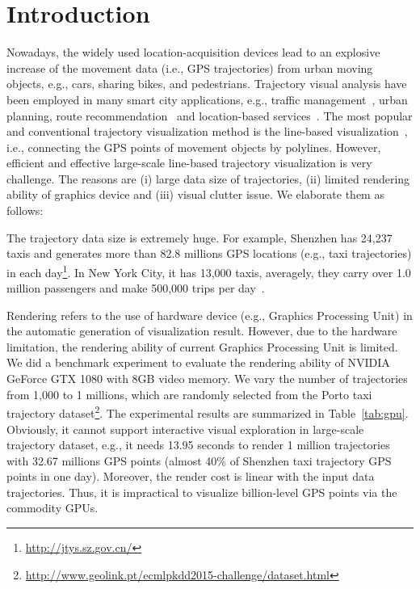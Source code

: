 \section{Introduction}
Nowadays, the widely used location-acquisition devices lead to an explosive increase of the movement data (i.e., GPS trajectories) from urban moving objects, e.g., cars, sharing bikes, and pedestrians.
Trajectory visual analysis have been employed in many smart city applications, e.g.,  traffic management~\cite{wang2014visual}, urban planning, route recommendation~\cite{zheng2011learning} and location-based services~\cite{liu2016smartadp, zheng2010collaborative}.
The most popular and conventional trajectory visualization method is the line-based visualization~\cite{chen2015survey}, i.e., connecting the GPS points of movement objects by polylines.
However, efficient and effective large-scale line-based trajectory visualization is very challenge.
The reasons are (i) large data size of trajectories, (ii) limited rendering ability of graphics device and (iii) visual clutter issue.
We elaborate them as follows:

 The trajectory data size is extremely huge.
For example, Shenzhen has 24,237 taxis and generates more than 82.8 millions GPS locations (e.g., taxi trajectories) in each day\footnote{\url{http://jtys.sz.gov.cn/}}.
In New York City, it has 13,000 taxis, averagely, they carry over 1.0 million passengers and make 500,000 trips per day~\cite{ferreira2013visual}.

Rendering refers to the use of hardware device (e.g., Graphics Processing Unit) in the automatic generation of visualization result.
However, due to the hardware limitation, the rendering ability of current Graphics Processing Unit is limited.
We did a benchmark experiment to evaluate the rendering ability of NVIDIA GeForce GTX 1080 with 8GB video memory.
We vary the number of trajectories from 1,000 to 1 millions, which are randomly selected from the Porto taxi trajectory dataset\footnote{\url{http://www.geolink.pt/ecmlpkdd2015-challenge/dataset.html}}.
The experimental results are summarized in Table~\ref{tab:gpu}.
Obviously, it cannot support interactive visual exploration in large-scale trajectory dataset, e.g.,
it needs 13.95 seconds to render 1 million trajectories with 32.67 millions GPS points (almost 40\% of Shenzhen taxi trajectory GPS points in one day).
Moreover, the render cost is linear with the input data trajectories.
Thus, it is impractical to visualize billion-level GPS points via the commodity GPUs.


